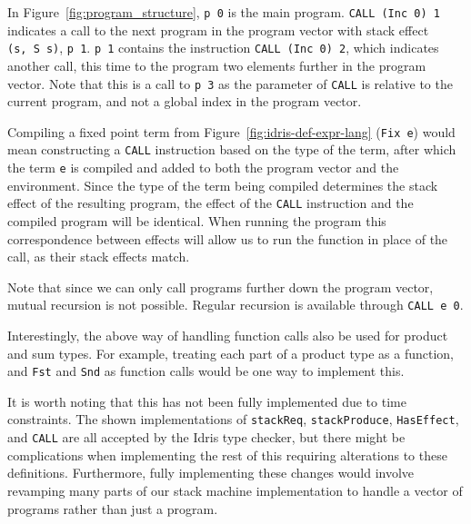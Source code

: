In Figure~\ref{fig:program_structure}, \texttt{p 0} is the main program. \texttt{CALL (Inc 0) 1} indicates a call to the next program in the program vector with stack effect \texttt{(s,~S~s)}, \texttt{p 1}. \texttt{p 1} contains the instruction \texttt{CALL (Inc 0) 2}, which indicates another call, this time to the program two elements further in the program vector. Note that this is a call to \texttt{p 3} as the parameter of \texttt{CALL} is relative to the current program, and not a global index in the program vector. 

Compiling a fixed point term from Figure~\ref{fig:idris-def-expr-lang} (\texttt{Fix e}) would mean constructing a \texttt{CALL} instruction based on the type of the term, after which the term \texttt{e} is compiled and added to both the program vector and the environment. Since the type of the term being compiled determines the stack effect of the resulting program, the effect of the \texttt{CALL} instruction and the compiled program will be identical. When running the program this correspondence between effects will allow us to run the function in place of the call, as their stack effects match.

Note that since we can only call programs further down the program vector, mutual recursion is not possible. Regular recursion is available through \texttt{CALL~e~0}.

Interestingly, the above way of handling function calls also be used for product and sum types. For example, treating each part of a product type as a function, and \texttt{Fst} and \texttt{Snd} as function calls would be one way to implement this.

It is worth noting that this has not been fully implemented due to time constraints. The shown implementations of \texttt{stackReq}, \texttt{stackProduce}, \texttt{HasEffect}, and \texttt{CALL} are all accepted by the Idris type checker, but there might be complications when implementing the rest of this requiring alterations to these definitions. Furthermore, fully implementing these changes would involve revamping many parts of our stack machine implementation to handle a vector of programs rather than just a program.
